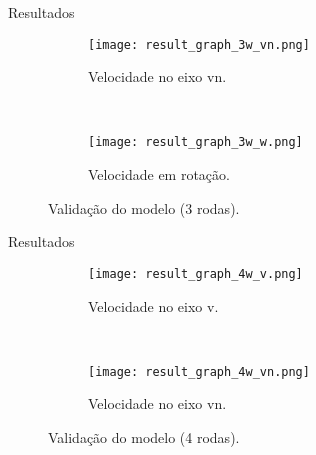 \begin{frame}[t]{Resultados}
  \transdissolve[duration=0.5]

  \begin{figure}[ht!]
    \centering
    \begin{subfigure}[b]{0.4\textwidth}
      \centering
      \texttt{[image: result\_graph\_3w\_vn.png]}
      \caption{Velocidade no eixo vn.}
      \label{fig:result_3w_vn}
    \end{subfigure}
    ~
    \begin{subfigure}[b]{0.4\textwidth}
      \texttt{[image: result\_graph\_3w\_w.png]}
      \caption{Velocidade em rotação.}
      \label{fig:result_3w_w}
    \end{subfigure}    
  \caption{Validação do modelo (3 rodas).}
  \end{figure}
  
\end{frame}

\begin{frame}[t]{Resultados}
  \transdissolve[duration=0.5]

  \begin{figure}[ht!]
    \centering
    \begin{subfigure}[b]{0.4\textwidth}
      \centering
      \texttt{[image: result\_graph\_4w\_v.png]}
      \caption{Velocidade no eixo v.}
      \label{fig:result_4w_v}
    \end{subfigure}
    ~
    \begin{subfigure}[b]{0.4\textwidth}
      \texttt{[image: result\_graph\_4w\_vn.png]}
      \caption{Velocidade no eixo vn.}
      \label{fig:result_4w_vn}
    \end{subfigure}    
  \caption{Validação do modelo (4 rodas).}
  \end{figure}
  
\end{frame}